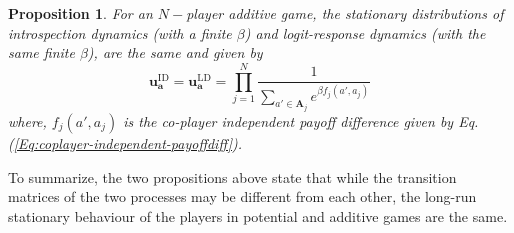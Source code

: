 \documentclass[11pt]{article}
\theoremstyle{plainCl1}
\newtheorem{Prop}{Proposition}
\theoremstyle{plainCl2}
\newcommand{\A}{\mathbf{A}}
\newcommand{\abf}{\mathbf{a}}
\newcommand{\ubf}{\mathbf{u}}
\newcommand{\LD}{\mathrm{LD}}
\newcommand{\ID}{\mathrm{ID}}
\begin{document}
\begin{Prop}
\label{Prop:additive-logit}
For an $N-$player additive game, the stationary distributions of introspection dynamics (with a finite $\beta$) and logit-response dynamics (with the same finite $\beta$), are the same and given by
\begin{equation}
\ubf^\ID_\abf = \ubf^\LD_\abf =  \prod_{j=1}^N \frac{1}{\displaystyle \sum_{a' \in \A_j} e^{\beta f_j(a', a_j)}} 
\label{Eq:logit-potential-stationary-dist}
\end{equation}
where, $f_j(a', a_j)$ is the co-player independent payoff difference given by Eq. (\ref{Eq:coplayer-independent-payoffdiff}).
\end{Prop}
\noindent To summarize, the two propositions above state that while the transition matrices of the two processes may be different from each other, the long-run stationary behaviour of the players in potential and additive games are the same.
\end{document}
